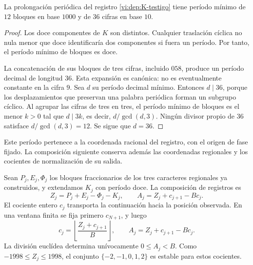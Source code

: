 \begin{proposition}
\label{vi:dep:periodo-minimo-k}
La prolongación periódica del registro \eqref{vi:dep:K-testigo}
tiene período mínimo de \(12\) bloques en base \(1000\) y de
\(36\) cifras en base \(10\).
\end{proposition}
\begin{proof}
Los doce componentes de \(K\) son distintos. Cualquier traslación
cíclica no nula menor que doce identificaría dos componentes si fuera
un período. Por tanto, el período mínimo de bloques es doce.

La concatenación de sus bloques de tres cifras, incluido \(058\),
produce un período decimal de longitud \(36\). Esta expansión es
canónica: no es eventualmente constante en la cifra \(9\).
Sea \(d\) su período decimal mínimo. Entonces \(d\mid36\),
porque los desplazamientos que preservan una palabra periódica forman
un subgrupo cíclico. Al agrupar las cifras de tres en tres, el período
mínimo de bloques es el menor \(k>0\) tal que \(d\mid3k\), es
decir, \(d/\gcd(d,3)\). Ningún divisor propio de \(36\)
satisface \(d/\gcd(d,3)=12\). Se sigue que \(d=36\).
\end{proof}

Este período pertenece a la coordenada racional del registro, con el
origen de fase fijado. La composición siguiente conserva además las
coordenadas regionales y los cocientes de normalización de su salida.

Sean \(P_j,E_j,\Phi_j\) los bloques fraccionarios de los tres
caracteres regionales ya construidos, y extendamos \(K_j\) con período
doce. La composición de registros es
\begin{equation}
 Z_j=P_j+E_j-\Phi_j-K_j,
 \qquad
 A_j=Z_j+c_{j+1}-Bc_j.
 \label{vi:dep:normalizacion-alpha}
\end{equation}
El cociente entero \(c_j\) transporta la continuación hacia la posición
observada. En una ventana finita se fija primero \(c_{N+1}\), y luego
\[
 c_j=\left\lfloor\frac{Z_j+c_{j+1}}B\right\rfloor,
 \qquad A_j=Z_j+c_{j+1}-Bc_j.
\]
La división euclídea determina unívocamente \(0\le A_j<B\).
Como \(-1998\le Z_j\le1998\), el conjunto
\(\{-2,-1,0,1,2\}\) es estable para estos cocientes.

